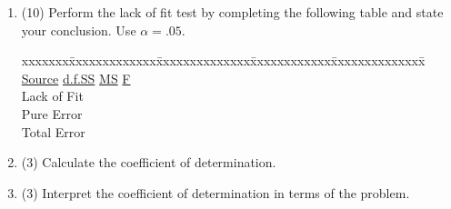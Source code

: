 \documentclass[11pt]{article}
\begin{document}
\begin{enumerate}
\begin{enumerate}
  

  \item (10) Perform the lack of fit test by completing the
  following table and state your conclusion.  Use $\alpha = .05$.\\
  \begin{tabbing}
xxxxxxx\=xxxxxxxxxxxxx\=xxxxxxxxxxxxxx\=xxxxxxxxxxxx\=xxxxxxxxxxxxxx\= \kill 
 \>\underline{Source} \>\underline{d.f.}\>\underline{SS}  \>\underline{MS}  \> \underline{F} \\[.1in] 
 \>Lack of Fit \>  \>   \\[.1in]
 \>Pure Error \\[.1in]
 \>Total Error \\[1in]
  \end{tabbing}  

 




\item (3) Calculate the coefficient of determination.\\[1.5in]
\item (3) Interpret the coefficient of determination in terms of the problem.\\[1.5in]


\end{enumerate}
\end{enumerate}
\end{document}
